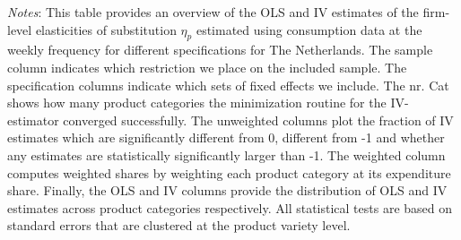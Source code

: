 \begin{landscape}
    \begin{table}[H]
        \centering
        \caption{Weekly Firm-level Elasticities: Dispersion instrument - The Netherlands}
        \label{tab: app_elas_eta_cats_weekly_q_NL}
        \begin{spacing}{1}
        \end{spacing}
        \parbox{1.2\textwidth}{
        \vspace{10pt}
        \begin{spacing}{1} 
            {\footnotesize 
            \textit{Notes}: This table provides an overview of the OLS and IV estimates of the firm-level elasticities of substitution $\eta_p$ estimated using consumption data at the weekly frequency for different specifications for The Netherlands. The sample column indicates which restriction we place on the included sample. The specification columns indicate which sets of fixed effects we include. The nr. Cat shows how many product categories the minimization routine for the IV-estimator converged successfully. The unweighted columns plot the fraction of IV estimates which are significantly different from 0, different from -1 and whether any estimates are statistically significantly larger than -1. The weighted column computes weighted shares by weighting each product category at its expenditure share. Finally, the OLS and IV columns provide the distribution of OLS and IV estimates across product categories respectively. All statistical tests are based on standard errors that are clustered at the product variety level.}
            \end{spacing}}
    \end{table}
\end{landscape}


